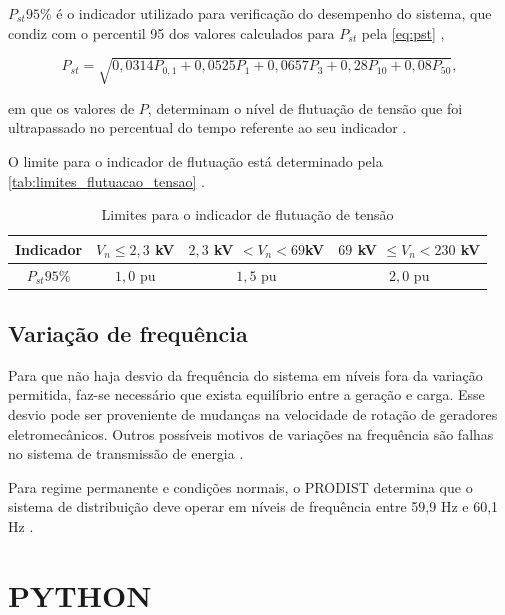 $P_{st}95\%$ é o indicador utilizado para verificação do desempenho do sistema, que condiz com o percentil 95 dos valores calculados para $P_{st}$ pela \autoref{eq:pst} \cite{ref:ANEEL2021},

\begin{equation}
P_{st}=\sqrt{0,0314 P_{0,1}+0,0525 P_1+0,0657 P_3+0,28 P_{10}+0,08 P_{50}},
\label{eq:pst}
\end{equation}

\noindent
em que os valores de $P$, determinam o nível de flutuação de tensão que foi ultrapassado no percentual do tempo referente ao seu indicador \cite{ref:ANEEL2021}.

O limite para o indicador de flutuação está determinado pela \autoref{tab:limites_flutuacao_tensao} \cite{ref:ANEEL2021}.

\begin{table}[H]
  \centering
  \caption{Limites para o indicador de flutuação de tensão}
  \label{tab:limites_flutuacao_tensao}
  \begin{tabular}{@{}cccc@{}}
  \toprule
  \textbf{Indicador} & \textbf{$V_n \leq  2,3$ kV} & \textbf{$2,3$ kV $< V_n  < 69 $kV} & \textbf{$69$ kV $\leq V_n  < 230$ kV} \\ \midrule
  $P_{st}95\%$ & $1,0$ pu & $1,5$ pu & $2,0$ pu \\ \bottomrule
  \end{tabular}
\end{table}

\subsection{Variação de frequência}

Para que não haja desvio da frequência do sistema em níveis fora da variação permitida, faz-se necessário que exista equilíbrio entre a geração e carga. Esse desvio pode ser proveniente de mudanças na velocidade de rotação de geradores eletromecânicos. Outros possíveis motivos de variações na frequência são falhas no sistema de transmissão de energia \cite{ref:fuchs_2015}.

Para regime permanente e condições normais, o PRODIST determina que o sistema de distribuição deve operar em níveis de frequência entre 59,9 Hz e 60,1 Hz \cite{ref:ANEEL2021}. 


\section{PYTHON}

